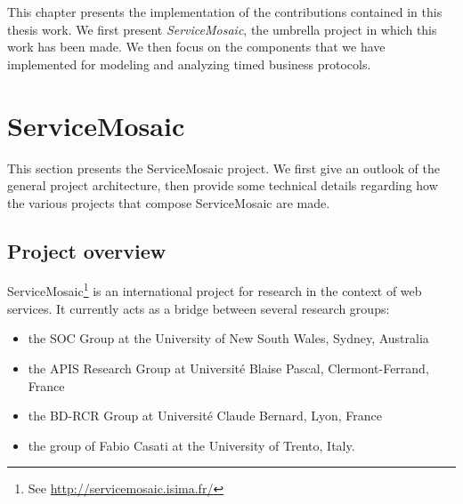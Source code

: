 
This chapter presents the implementation of the contributions contained in this thesis work. We first present \emph{ServiceMosaic}, the umbrella project in which this work has been made. We then focus on the components that we have implemented for modeling and analyzing timed business protocols.


\section{ServiceMosaic}


This section presents the ServiceMosaic project. We first give an outlook of the general project architecture, then provide some technical details regarding how the various projects that compose ServiceMosaic are made.


\subsection{Project overview}


ServiceMosaic\footnote{See \url{http://servicemosaic.isima.fr/}} is an international project for research in the context of web services. It currently acts as a bridge between several research groups:
\begin{itemize}

	\item the SOC Group at the University of New South Wales, Sydney, Australia
	
	\item the APIS Research Group at Universit\'e Blaise Pascal, Clermont-Ferrand, France
	
	\item the BD-RCR Group at Universit\'e Claude Bernard, Lyon, France
	
	\item the group of Fabio Casati at the University of Trento, Italy.

\end{itemize}

